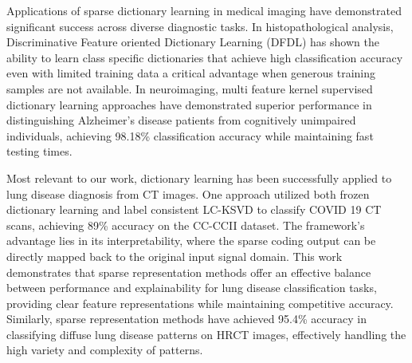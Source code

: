 Applications of sparse dictionary learning in medical imaging have demonstrated significant success across diverse diagnostic tasks.
In histopathological analysis, Discriminative Feature oriented Dictionary Learning (DFDL) has shown the ability to learn
class specific dictionaries that achieve high classification accuracy even with limited training data a critical advantage when generous
training samples are not available\cite{dfdlhisto}. In neuroimaging, multi feature kernel supervised dictionary learning approaches
have demonstrated superior performance in distinguishing Alzheimer's disease patients from cognitively unimpaired individuals,
achieving 98.18\% classification accuracy while maintaining fast testing times\cite{mkscddlad}.

Most relevant to our work, dictionary learning has been successfully applied to lung disease diagnosis from CT images.
One approach utilized both frozen dictionary learning and label consistent LC-KSVD to classify COVID 19 CT scans, achieving
89\% accuracy on the CC-CCII dataset\cite{covidct}.
The framework's advantage lies in its interpretability, where the sparse coding output can be directly mapped back to the original
input signal domain. This work demonstrates that sparse representation methods offer an effective balance between performance and
explainability for lung disease classification tasks, providing clear feature representations while maintaining competitive accuracy.
Similarly, sparse representation methods have achieved 95.4\% accuracy in classifying diffuse lung disease patterns on HRCT images,
effectively handling the high variety and complexity of patterns\cite{sparsedld}.

